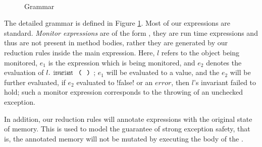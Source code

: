 \begin{figure}
\begin{grammatica}
		
		\\
		\\
		\\
		\\
		\\
		\\
	\end{grammatica}%
	\caption{Grammar}\label{f:grammar}\SS[2]
\end{figure}


The detailed grammar is defined in Figure \ref{f:grammar}. 
Most of our expressions are standard.
\emph{Monitor expressions}
 are of the form , they 
are run time expressions and thus are not present in method bodies, rather they are generated by our reduction rules inside the main expression. Here, $l$ refers to the object being monitored, $e_1$ is the expression which is being monitored, and $e_2$ denotes the evaluation of $l.\invariant$; $e_1$ will be evaluated to a value, and the $e_2$ will be further evaluated, if $e_2$ evaluated to \Q!false! or an $\mathit{error}$, then $l$'s invariant failed to hold; such a monitor expression corresponds to the throwing of an unchecked exception.

In addition, our reduction rules will annotate \Q@try@ expressions with
the original state of memory. This is used to model the guarantee of strong exception safety, that is, the annotated memory will not be mutated by executing the body of the \Q@try@.

